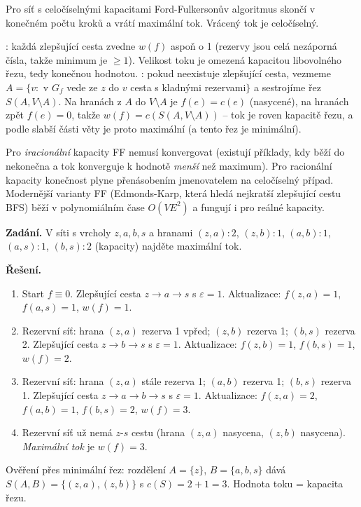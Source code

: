\documentclass[11pt,a4paper]{article}
\begin{document}
\begin{veta}
Pro síť s celočíselnými kapacitami Ford-Fulkersonův algoritmus skončí v konečném počtu kroků a vrátí maximální tok. Vrácený tok je celočíselný.
\end{veta}

\begin{intuice}
: každá zlepšující cesta zvedne $w(f)$ aspoň o 1 (rezervy jsou celá nezáporná čísla, takže minimum je $\ge 1$). Velikost toku je omezená kapacitou libovolného řezu, tedy konečnou hodnotou. : pokud neexistuje zlepšující cesta, vezmeme $A=\{v:$ v $G_f$ vede ze $z$ do $v$ cesta s kladnými rezervami$\}$ a sestrojíme řez $S(A,V\setminus A)$. Na hranách z $A$ do $V\setminus A$ je $f(e)=c(e)$ (nasycené), na hranách zpět $f(e)=0$, takže $w(f)=c(S(A,V\setminus A))$ -- tok je roven kapacitě řezu, a podle slabší části věty je proto maximální (a tento řez je minimální).
\end{intuice}

\begin{poznamka}
Pro \emph{iracionální} kapacity FF nemusí konvergovat (existují příklady, kdy běží do nekonečna a tok konverguje k hodnotě \emph{menší} než maximum). Pro racionální kapacity konečnost plyne přenásobením jmenovatelem na celočíselný případ. Modernější varianty FF (Edmonds-Karp, která hledá nejkratší zlepšující cestu BFS) běží v polynomiálním čase $O(VE^2)$ a fungují i pro reálné kapacity.
\end{poznamka}

\begin{priklad}
\textbf{Zadání.}
V síti s vrcholy $z,a,b,s$ a hranami $(z,a):2$, $(z,b):1$, $(a,b):1$, $(a,s):1$, $(b,s):2$ (kapacity) najděte maximální tok.

\textbf{Řešení.}
\begin{enumerate}[label=(\arabic*)]
  \item Start $f\equiv 0$. Zlepšující cesta $z\to a\to s$ s $\varepsilon=1$. Aktualizace: $f(z,a)=1$, $f(a,s)=1$, $w(f)=1$.
  \item Rezervní síť: hrana $(z,a)$ rezerva 1 vpřed; $(z,b)$ rezerva 1; $(b,s)$ rezerva 2. Zlepšující cesta $z\to b\to s$ s $\varepsilon=1$. Aktualizace: $f(z,b)=1$, $f(b,s)=1$, $w(f)=2$.
  \item Rezervní síť: hrana $(z,a)$ stále rezerva 1; $(a,b)$ rezerva 1; $(b,s)$ rezerva 1. Zlepšující cesta $z\to a\to b\to s$ s $\varepsilon=1$. Aktualizace: $f(z,a)=2$, $f(a,b)=1$, $f(b,s)=2$, $w(f)=3$.
  \item Rezervní síť už nemá $z$-$s$ cestu (hrana $(z,a)$ nasycena, $(z,b)$ nasycena). \emph{Maximální tok} je $w(f)=3$.
\end{enumerate}
Ověření přes minimální řez: rozdělení $A=\{z\}$, $B=\{a,b,s\}$ dává $S(A,B)=\{(z,a),(z,b)\}$ s $c(S)=2+1=3$. Hodnota toku = kapacita řezu.
\end{priklad}
\end{document}

